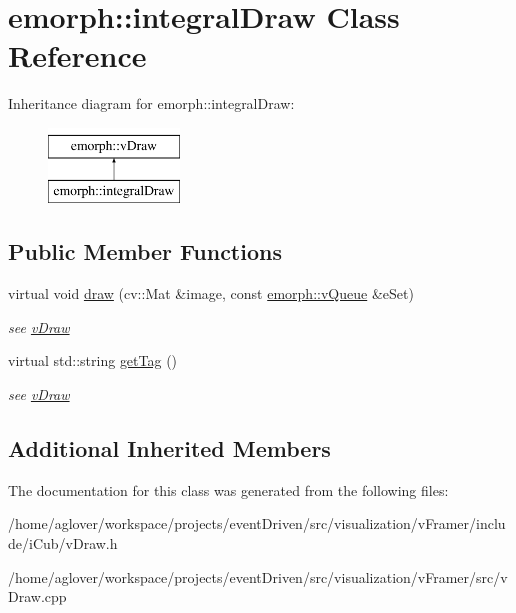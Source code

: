 \hypertarget{classemorph_1_1integralDraw}{\section{emorph\-:\-:integral\-Draw Class Reference}
\label{classemorph_1_1integralDraw}
}
Inheritance diagram for emorph\-:\-:integral\-Draw\-:\begin{figure}[H]
\begin{center}
\leavevmode
\includegraphics[height=2.000000cm]{classemorph_1_1integralDraw}
\end{center}
\end{figure}
\subsection*{Public Member Functions}
\begin{DoxyCompactItemize}
\item 
\hypertarget{classemorph_1_1integralDraw_a18b3d64b6b81b43c66df4c67955429ff}{virtual void \hyperlink{classemorph_1_1integralDraw_a18b3d64b6b81b43c66df4c67955429ff}{draw} (cv\-::\-Mat \&image, const \hyperlink{classemorph_1_1vQueue}{emorph\-::v\-Queue} \&e\-Set)}\label{classemorph_1_1integralDraw_a18b3d64b6b81b43c66df4c67955429ff}

\begin{DoxyCompactList}\small\item\em see \hyperlink{classemorph_1_1vDraw}{v\-Draw} \end{DoxyCompactList}\item 
\hypertarget{classemorph_1_1integralDraw_a3383c3587a1d99fb3a2352ae4e02371d}{virtual std\-::string \hyperlink{classemorph_1_1integralDraw_a3383c3587a1d99fb3a2352ae4e02371d}{get\-Tag} ()}\label{classemorph_1_1integralDraw_a3383c3587a1d99fb3a2352ae4e02371d}

\begin{DoxyCompactList}\small\item\em see \hyperlink{classemorph_1_1vDraw}{v\-Draw} \end{DoxyCompactList}\end{DoxyCompactItemize}
\subsection*{Additional Inherited Members}


The documentation for this class was generated from the following files\-:\begin{DoxyCompactItemize}
\item 
/home/aglover/workspace/projects/event\-Driven/src/visualization/v\-Framer/include/i\-Cub/v\-Draw.\-h\item 
/home/aglover/workspace/projects/event\-Driven/src/visualization/v\-Framer/src/v\-Draw.\-cpp\end{DoxyCompactItemize}
